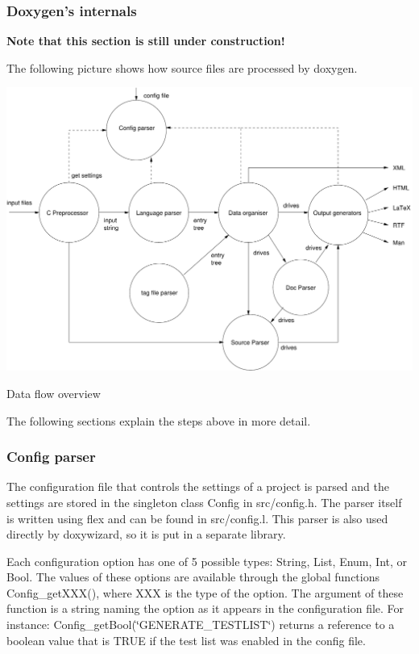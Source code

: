 \subsubsection*{Doxygen's internals}

{\bfseries Note that this section is still under construction!}

The following picture shows how source files are processed by doxygen.


\begin{DoxyImage}
\includegraphics[width=14cm]{archoverview}
\caption{Data flow overview}
\end{DoxyImage}


The following sections explain the steps above in more detail.

\subsubsection*{Config parser}

The configuration file that controls the settings of a project is parsed and the settings are stored in the singleton class {\ttfamily Config} in {\ttfamily src/config.h}. The parser itself is written using {\ttfamily flex} and can be found in {\ttfamily src/config.l}. This parser is also used directly by {\ttfamily doxywizard}, so it is put in a separate library.

Each configuration option has one of 5 possible types: {\ttfamily String}, {\ttfamily List}, {\ttfamily Enum}, {\ttfamily Int}, or {\ttfamily Bool}. The values of these options are available through the global functions {\ttfamily Config\_\-getXXX()}, where {\ttfamily XXX} is the type of the option. The argument of these function is a string naming the option as it appears in the configuration file. For instance: {\ttfamily Config\_\-getBool}(\char`\"{}GENERATE\_\-TESTLIST\char`\"{}) returns a reference to a boolean value that is {\ttfamily TRUE} if the test list was enabled in the config file.

